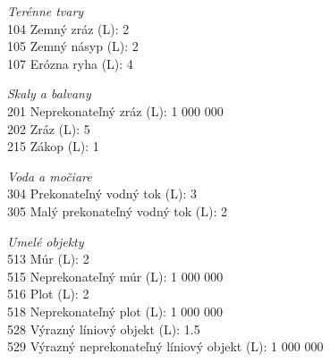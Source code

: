 \documentclass[12pt,a4paper]{report}
\begin{document}
\textit{Terénne tvary}\\
104 Zemný zráz (L): 2\\
105 Zemný násyp (L): 2\\
107 Erózna ryha (L): 4

\textit{Skaly a balvany}\\
201 Neprekonateľný zráz (L): 1 000 000\\
202 Zráz (L): 5\\
215 Zákop (L): 1

\textit{Voda a močiare}\\
304 Prekonateľný vodný tok (L): 3\\
305 Malý prekonateľný vodný tok (L): 2

\textit{Umelé objekty}\\
513 Múr (L): 2\\
515 Neprekonateľný múr (L): 1 000 000\\
516 Plot (L): 2\\
518 Neprekonateľný plot (L): 1 000 000\\
528 Výrazný líniový objekt (L): 1.5\\
529 Výrazný neprekonateľný líniový objekt (L): 1 000 000
\end{document}
